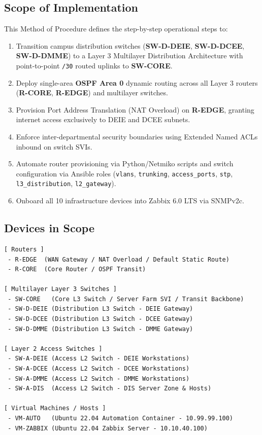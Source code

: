 \documentclass[11pt,a4paper]{article}
\begin{document}
\subsection{Scope of Implementation}
This Method of Procedure defines the step-by-step operational steps to:
\begin{enumerate}
    \item Transition campus distribution switches (\textbf{SW-D-DEIE}, \textbf{SW-D-DCEE}, \textbf{SW-D-DMME}) to a Layer 3 Multilayer Distribution Architecture with point-to-point \texttt{/30} routed uplinks to \textbf{SW-CORE}.
    \item Deploy single-area \textbf{OSPF Area 0} dynamic routing across all Layer 3 routers (\textbf{R-CORE}, \textbf{R-EDGE}) and multilayer switches.
    \item Provision Port Address Translation (NAT Overload) on \textbf{R-EDGE}, granting internet access exclusively to DEIE and DCEE subnets.
    \item Enforce inter-departmental security boundaries using Extended Named ACLs inbound on switch SVIs.
    \item Automate router provisioning via Python/Netmiko scripts and switch configuration via Ansible roles (\texttt{vlans}, \texttt{trunking}, \texttt{access\_ports}, \texttt{stp}, \texttt{l3\_distribution}, \texttt{l2\_gateway}).
    \item Onboard all 10 infrastructure devices into Zabbix 6.0 LTS via SNMPv2c.
\end{enumerate}

\subsection{Devices in Scope}

\begin{lstlisting}[style=console, caption={Infrastructure Devices in Scope}]
[ Routers ]
 - R-EDGE  (WAN Gateway / NAT Overload / Default Static Route)
 - R-CORE  (Core Router / OSPF Transit)

[ Multilayer Layer 3 Switches ]
 - SW-CORE   (Core L3 Switch / Server Farm SVI / Transit Backbone)
 - SW-D-DEIE (Distribution L3 Switch - DEIE Gateway)
 - SW-D-DCEE (Distribution L3 Switch - DCEE Gateway)
 - SW-D-DMME (Distribution L3 Switch - DMME Gateway)

[ Layer 2 Access Switches ]
 - SW-A-DEIE (Access L2 Switch - DEIE Workstations)
 - SW-A-DCEE (Access L2 Switch - DCEE Workstations)
 - SW-A-DMME (Access L2 Switch - DMME Workstations)
 - SW-A-DIS  (Access L2 Switch - DIS Server Zone & Hosts)

[ Virtual Machines / Hosts ]
 - VM-AUTO   (Ubuntu 22.04 Automation Container - 10.99.99.100)
 - VM-ZABBIX (Ubuntu 22.04 Zabbix Server - 10.10.40.100)
\end{lstlisting}
\end{document}
